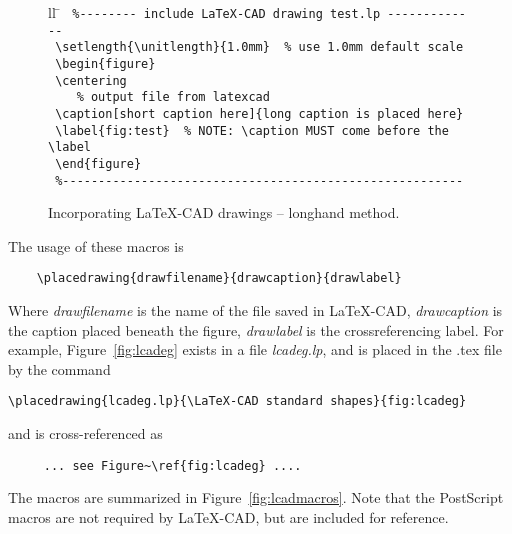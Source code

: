 \documentclass[a4paper]{article}
\begin{document}
\begin{figure}
	\centering
	\begin{tabbing}{ll}
		\hspace{3mm} \= \kill
		 \verb! %-------- include LaTeX-CAD drawing test.lp ------------- ! \\
		 \verb! \setlength{\unitlength}{1.0mm}  % use 1.0mm default scale ! \\
		 \verb! \begin{figure} ! \\
			\> \verb! \centering !  \\
			\> \verb!    % output file from latexcad ! \\
			\> \verb! \caption[short caption here]{long caption is placed here} ! \\
			\> \verb! \label{fig:test}  % NOTE: \caption MUST come before the \label ! \\
		 \verb! \end{figure} !   \\
		 \verb! %-------------------------------------------------------- ! \\
	\end{tabbing}
	\caption{Incorporating LaTeX-CAD drawings -- longhand method.}
	\label{fig:longhand}
\end{figure}

The usage of these macros is
\begin{verbatim}
	\placedrawing{drawfilename}{drawcaption}{drawlabel}
\end{verbatim}

Where \textit{drawfilename} is the name of the file saved in LaTeX-CAD,
\textit{drawcaption} is the caption placed beneath the figure,
\textit{drawlabel} is the crossreferencing label. For example,
Figure~\ref{fig:lcadeg} exists in a file \textit{lcadeg.lp}, and is
placed in the .tex file by the command
\begin{verbatim}
\placedrawing{lcadeg.lp}{\LaTeX-CAD standard shapes}{fig:lcadeg}
\end{verbatim}
and is cross-referenced as
\begin{verbatim}
	 ... see Figure~\ref{fig:lcadeg} ....
\end{verbatim}

The macros are summarized in Figure~\ref{fig:lcadmacros}. Note that
the PostScript macros are not required by LaTeX-CAD, but are included
for reference.
\end{document}
